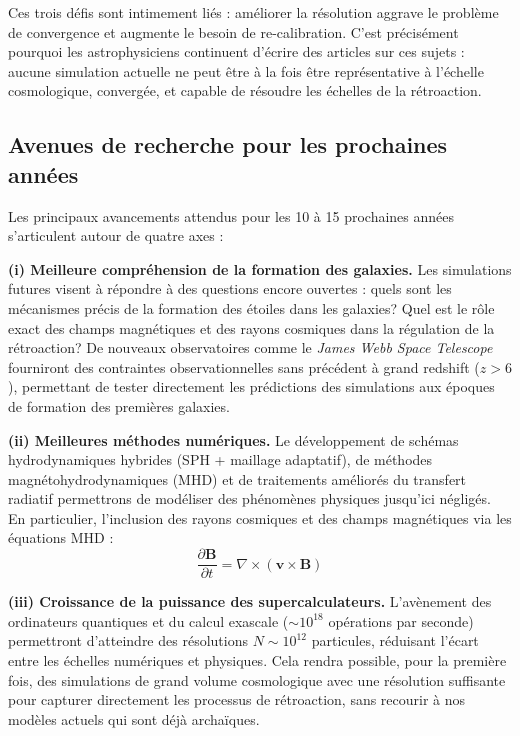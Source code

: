 \documentclass{article}
\begin{document}
Ces trois défis sont intimement liés : améliorer la résolution 
aggrave le problème de convergence et augmente le besoin de 
re-calibration. C'est précisément pourquoi les astrophysiciens 
continuent d'écrire des articles sur ces sujets :  aucune 
simulation actuelle ne peut être à la fois 
être représentative à l'échelle cosmologique, convergée, et 
capable de résoudre les échelles de la rétroaction.

\subsection{Avenues de recherche pour les prochaines années}

Les principaux avancements attendus pour les 10 à 15 prochaines 
années s'articulent autour de quatre axes \cite{Vogelsberger2020} :

\textbf{(i) Meilleure compréhension de la formation des galaxies.} 
Les simulations futures visent à répondre à des questions encore 
ouvertes : quels sont les mécanismes précis de la formation des étoiles dans les galaxies? Quel est le rôle exact des champs 
magnétiques et des rayons cosmiques dans la régulation de la rétroaction? 
De nouveaux observatoires comme le \textit{James Webb Space Telescope} fourniront des contraintes observationnelles sans précédent à grand redshift ($z > 6$), permettant de tester directement les prédictions des simulations aux époques de formation des premières galaxies.

\textbf{(ii) Meilleures méthodes numériques.} Le développement de 
schémas hydrodynamiques hybrides (SPH + maillage adaptatif), de 
méthodes magnétohydrodynamiques (MHD) et de traitements améliorés 
du transfert radiatif permettrons de modéliser des phénomènes physiques jusqu'ici 
négligés. En particulier, l'inclusion des rayons cosmiques et des 
champs magnétiques via les équations MHD :
%
\begin{equation}
    \frac{\partial \mathbf{B}}{\partial t} = 
    \nabla \times (\mathbf{v} \times \mathbf{B})
    \label{eq:MHD_ccl}
\end{equation}
%


\textbf{(iii) Croissance de la puissance des supercalculateurs.} 
L'avènement des ordinateurs quantiques et du calcul exascale ($\sim 10^{18}$ opérations par seconde) permettront d'atteindre des résolutions $N \sim 10^{12}$ particules, réduisant l'écart entre les échelles numériques et physiques. Cela rendra possible, pour la première fois, des simulations de grand volume cosmologique avec une résolution suffisante pour capturer directement les processus de rétroaction, sans recourir à nos modèles actuels qui sont déjà archaïques.
\end{document}
